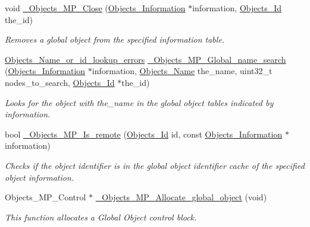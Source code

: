 \begin{DoxyCompactItemize}
void \mbox{\hyperlink{group__RTEMSScoreObjectMP_gaddafb4298b03f748102e804b89aaea15}{\+\_\+\+Objects\+\_\+\+M\+P\+\_\+\+Close}} (\mbox{\hyperlink{structObjects__Information}{Objects\+\_\+\+Information}} $\ast$information, \mbox{\hyperlink{group__RTEMSScoreObject_ga5821f52a51072941bdd603e542d0863e}{Objects\+\_\+\+Id}} the\+\_\+id)
\begin{DoxyCompactList}\small\item\em Removes a global object from the specified information table. \end{DoxyCompactList}\item 
\mbox{\hyperlink{group__RTEMSScoreObject_gaccfeec04954711c389b10aeccc91cabe}{Objects\+\_\+\+Name\+\_\+or\+\_\+id\+\_\+lookup\+\_\+errors}} \mbox{\hyperlink{group__RTEMSScoreObjectMP_ga9bca9a227f05b1c197c498b019fc9099}{\+\_\+\+Objects\+\_\+\+M\+P\+\_\+\+Global\+\_\+name\+\_\+search}} (\mbox{\hyperlink{structObjects__Information}{Objects\+\_\+\+Information}} $\ast$information, \mbox{\hyperlink{unionObjects__Name}{Objects\+\_\+\+Name}} the\+\_\+name, uint32\+\_\+t nodes\+\_\+to\+\_\+search, \mbox{\hyperlink{group__RTEMSScoreObject_ga5821f52a51072941bdd603e542d0863e}{Objects\+\_\+\+Id}} $\ast$the\+\_\+id)
\begin{DoxyCompactList}\small\item\em Looks for the object with the\+\_\+name in the global object tables indicated by information. \end{DoxyCompactList}\item 
bool \mbox{\hyperlink{group__RTEMSScoreObjectMP_gae1144d0c54b95368022bd861539e9694}{\+\_\+\+Objects\+\_\+\+M\+P\+\_\+\+Is\+\_\+remote}} (\mbox{\hyperlink{group__RTEMSScoreObject_ga5821f52a51072941bdd603e542d0863e}{Objects\+\_\+\+Id}} id, const \mbox{\hyperlink{structObjects__Information}{Objects\+\_\+\+Information}} $\ast$information)
\begin{DoxyCompactList}\small\item\em Checks if the object identifier is in the global object identifier cache of the specified object information. \end{DoxyCompactList}\item 
\mbox{\label{group__RTEMSScoreObjectMP_gaac123fca33d27617283f1d6ec4a4f1bd}} 
Objects\+\_\+\+M\+P\+\_\+\+Control $\ast$ \mbox{\hyperlink{group__RTEMSScoreObjectMP_gaac123fca33d27617283f1d6ec4a4f1bd}{\+\_\+\+Objects\+\_\+\+M\+P\+\_\+\+Allocate\+\_\+global\+\_\+object}} (void)
\begin{DoxyCompactList}\small\item\em This function allocates a Global Object control block. \end{DoxyCompactList}\item 

\end{DoxyCompactItemize}
